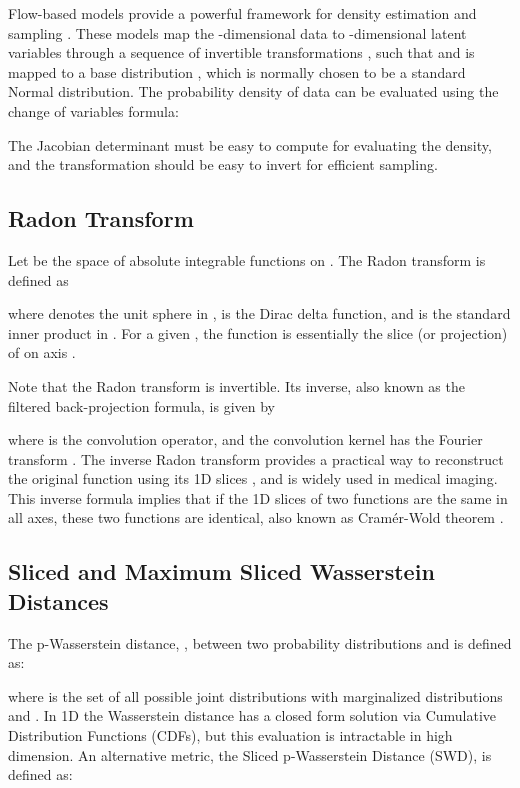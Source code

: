 \documentclass{article}
\begin{document}
Flow-based models provide a powerful framework for density estimation \citep{dinh2016density, papamakarios2017masked}
and sampling \citep{kingma2018glow}. These models map the -dimensional data  to -dimensional latent variables  through a sequence of invertible transformations , such that  and  is mapped to a base distribution , which is normally chosen to be a standard Normal distribution. The probability density of data  can be evaluated using the change of variables formula:

The Jacobian determinant  must be easy to compute for evaluating the density, and the transformation  should be easy to invert for efficient sampling.



\subsection{Radon Transform}
\label{subsec:radon}

Let  be the space of absolute integrable functions on . The Radon transform  is defined as 

where  denotes the unit sphere  in ,  is the Dirac delta function, and  is the standard inner product in . For a given , the function  is essentially the slice (or projection) of  on axis .

Note that the Radon transform  is invertible. Its inverse, also known as the filtered back-projection formula, is given by \citep{helgason2010integral, kolouri2019generalized}

where  is the convolution operator, and the convolution kernel  has the Fourier transform . The inverse Radon transform provides a practical way to reconstruct the original function  using its 1D slices , and is widely used in medical imaging. This inverse formula implies that if the 1D slices of two functions are the same in all axes, these two functions are identical, also known as Cram{\'e}r-Wold theorem \citep{cramer1936some}.

\subsection{Sliced and Maximum Sliced Wasserstein Distances}
\label{subsec:SWD}

The p-Wasserstein distance, , between two probability distributions  and  is defined as:

where  is the set of all possible joint distributions  with marginalized distributions  and . In 1D the Wasserstein distance has a closed form solution via Cumulative Distribution Functions (CDFs), but this evaluation is intractable in high dimension. An alternative metric, the Sliced p-Wasserstein Distance (SWD), is defined as:
\end{document}
